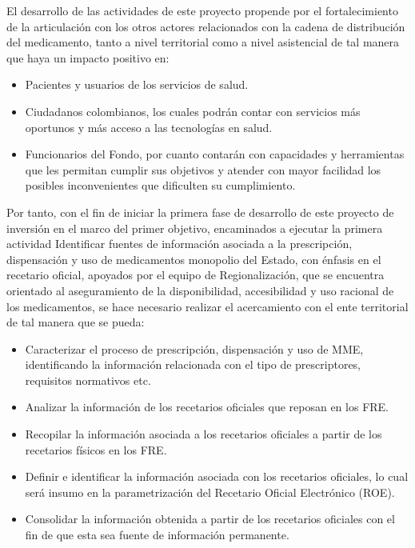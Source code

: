 \documentclass[
]{book}
\begin{document}
El desarrollo de las actividades de este proyecto propende por el fortalecimiento de la articulación con los otros actores relacionados con la cadena de distribución del medicamento, tanto a nivel territorial como a nivel asistencial de tal manera que haya un impacto positivo en:

\begin{itemize}
\item
  Pacientes y usuarios de los servicios de salud.
\item
  Ciudadanos colombianos, los cuales podrán contar con servicios más oportunos y más acceso a las tecnologías en salud.
\item
  Funcionarios del Fondo, por cuanto contarán con capacidades y herramientas que les permitan cumplir sus objetivos y atender con mayor facilidad los posibles inconvenientes que dificulten su cumplimiento.
\end{itemize}

Por tanto, con el fin de iniciar la primera fase de desarrollo de este proyecto de inversión en el marco del primer objetivo, encaminados a ejecutar la primera actividad Identificar fuentes de información asociada a la prescripción, dispensación y uso de medicamentos monopolio del Estado, con énfasis en el recetario oficial, apoyados por el equipo de Regionalización, que se encuentra orientado al aseguramiento de la disponibilidad, accesibilidad y uso racional de los medicamentos, se hace necesario realizar el acercamiento con el ente territorial de tal manera que se pueda:

\begin{itemize}
\item
  Caracterizar el proceso de prescripción, dispensación y uso de MME, identificando la información relacionada con el tipo de prescriptores, requisitos normativos etc.
\item
  Analizar la información de los recetarios oficiales que reposan en los FRE.
\item
  Recopilar la información asociada a los recetarios oficiales a partir de los recetarios físicos en los FRE.
\item
  Definir e identificar la información asociada con los recetarios oficiales, lo cual será insumo en la parametrización del Recetario Oficial Electrónico (ROE).
\item
  Consolidar la información obtenida a partir de los recetarios oficiales con el fin de que esta sea fuente de información permanente.
\end{itemize}
\end{document}
